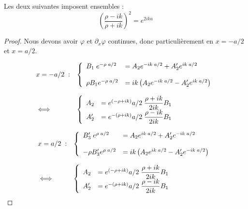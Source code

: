 \documentclass{book}
\begin{document}
  Les deux suivantes imposent ensembles :
  \begin{equation}\label{eq:chap3-pot_carre_conditions}
    \left(\dfrac{\rho - ik}{\rho + ik} \right) ^2 = e ^{2ika}
  \end{equation}
  \begin{proof}
    Nous devons avoir $\varphi$ et $\partial_x \varphi$ continues, donc particulièrement en $x=-a/2$ et $x=a/2$.

    $$
    \begin{array}{ll}
      x=-a/2 \; :& \left\{
        \begin{array}{ll}
          B_1 \; e^{-\rho\; a/2} &= A_2 e^{-ik\; a/2} + A_2 ' e^{ik\; a/2} \\
          \strut \\
          \rho B_1 e^{-\rho\; a/2} &= ik\left(A_2e^{-ik\; a/2} - A_2 ' e^{ik\; a/2}\right)
        \end{array}
      \right. \\
      \strut \\
      \iff& \left\{
        \begin{array}{ll}
          A_2 &= e^{(-\rho + ik)} a/2 \; \dfrac{\rho + ik}{2ik} B_1 \\
          A_2 ' &= e^{-(\rho + ik)} a/2 \; \dfrac{\rho - ik}{2ik} B_1 \\
        \end{array}
      \right. \\
    \end{array}
    $$

    $$
    \begin{array}{ll}
      x=a/2 \; :& \left\{
        \begin{array}{ll}
          B_3 ' \; e^{\rho\; a/2} &= A_2 e^{ik\; a/2} + A_2 ' e^{-ik\; a/2} \\
          \strut \\
          -\rho B_3 ' e^{\rho\; a/2} &= ik\left(A_2e^{ik\; a/2} - A_2 ' e^{-ik\; a/2}\right)
        \end{array}
      \right. \\
      \strut \\
      \iff& \left\{
        \begin{array}{ll}
          A_2 &= e^{(-\rho + ik)} a/2 \; \dfrac{\rho + ik}{2ik} B_1 \\
          A_2 ' &= e^{-(\rho + ik)} a/2 \; \dfrac{\rho - ik}{2ik} B_1 \\
        \end{array}
      \right. \\
    \end{array}
    $$
  \end{proof}
\end{document}
